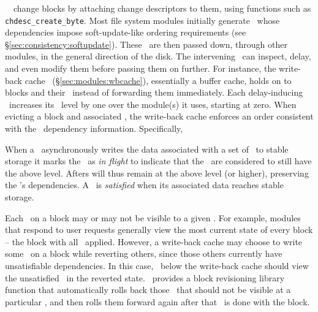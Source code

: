 \Kudos\ \modules\ change blocks by attaching change descriptors to them,
using functions such as \texttt{chdesc\_create\_byte}.
%
Most file system modules initially generate \chdescs\ whose
dependencies impose soft-update-like ordering requirements (see
\S\ref{sec:consistency:softupdate}).  These \chdescs\ are then passed down,
through other modules, in the general direction of the disk.  The
intervening \modules\ can
inspect, delay, and even modify them before passing them on further. For
instance, the write-back cache \module\ (\S\ref{sec:modules:wbcache}),
essentially a buffer cache, holds
on to blocks and their \chdescs\ instead of forwarding them
immediately. Each delay-inducing \module\ increases its \module\
level by one over the module(s) it uses, starting at zero.
%
When evicting a block and associated \chdescs, the write-back
cache enforces an order consistent with the \chdesc\ dependency
information. Specifically,

When a \module\ asynchronously writes the data associated with a set
of \chdescs\ to stable storage it marks the \chdescs\ as
\emph{in flight} to indicate that the \chdescs\ are considered to still
have the above level. Afters will thus remain at the above level (or
higher), preserving the \chdescs{}'s dependencies.
%
A \chdesc\ is \emph{satisfied} when its associated data reaches stable
storage.

Each \chdesc\ on a block may or may not be visible to a given \module.
%
For example, modules that respond to user requests generally view the most
 current state of every block -- the block with all \chdescs\ applied.
%
However, a write-back cache may choose to write some \chdescs\ on a block
 while reverting others, since those others currently have unsatisfiable
 dependencies.
%
In this case, \modules\ below the write-back cache should view the
 unsatisfied \chdescs\ in the reverted state.
%
%
\Kudos\ provides a block revisioning library function that automatically rolls back those
 \chdescs\ that should not be visible at a particular \module, and then
 rolls them forward again after that \module\ is done with the block.


